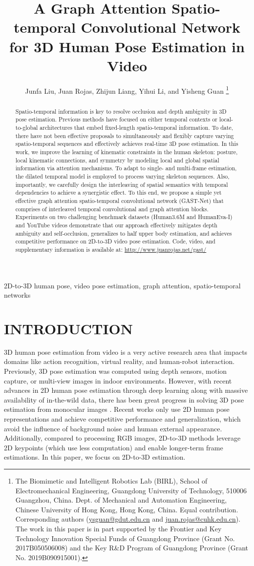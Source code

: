 \documentclass[letterpaper, 10 pt, conference, twoside]{ieeeconf}
\title{\LARGE \bf
	A Graph Attention Spatio-temporal Convolutional Network for 3D Human Pose Estimation in Video}
\author{Junfa Liu, Juan Rojas, Zhijun Liang, Yihui Li, and Yisheng Guan \thanks{The Biomimetic and Intelligent Robotics Lab (BIRL), School of Electromechanical Engineering, Guangdong University of Technology, 510006 Guangzhou, China. Dept. of Mechanical and Automation Engineering,  Chinese University of Hong Kong, Hong Kong, China.  Equal contribution.  Corresponding authors (\url{ysguan@gdut.edu.cn} and \url{juan.rojas@cuhk.edu.cn}). The work in this paper is in part supported by the  Frontier and Key Technology Innovation Special Funds of Guangdong Province (Grant No. 2017B050506008) and the Key R\&D Program of Guangdong Province (Grant No. 2019B090915001).}
	}
\begin{document}
\maketitle
\thispagestyle{empty}
\pagestyle{empty}
\begin{abstract}
Spatio-temporal information is key to resolve occlusion and depth ambiguity in 3D pose estimation. Previous methods have focused on either temporal contexts or local-to-global architectures that embed fixed-length spatio-temporal information. To date, there have not been effective proposals to simultaneously and flexibly capture varying spatio-temporal sequences and effectively achieves real-time 3D pose estimation.
In this work, we improve the learning of kinematic constraints in the human skeleton: posture, local kinematic connections, and symmetry by modeling local and global spatial information via attention mechanisms. To adapt to single- and multi-frame estimation, the dilated temporal model is employed to process varying skeleton sequences. Also, importantly, we carefully design the interleaving of spatial semantics with temporal dependencies to achieve a synergistic effect. 
To this end, we propose a simple yet effective graph attention spatio-temporal convolutional network (GAST-Net) that comprises of interleaved temporal convolutional and graph attention blocks.
Experiments on two challenging benchmark datasets (Human3.6M and HumanEva-I) and YouTube videos demonstrate that our approach effectively mitigates depth ambiguity and self-occlusion, generalizes to half upper body estimation, and achieves competitive performance on 2D-to-3D video pose estimation. Code, video, and supplementary information is available at: \href{http://www.juanrojas.net/gast/}{http://www.juanrojas.net/gast/}
\end{abstract}

\begin{keywords}
2D-to-3D human pose, video pose estimation, graph attention, spatio-temporal networks
\end{keywords}

\section{INTRODUCTION}
3D human pose estimation from video is a very active research area that impacts domains like action recognition, virtual reality, and human-robot interaction. Previously, 3D pose estimation was computed using depth sensors, motion capture, or multi-view images in indoor environments. However, with recent advances in 2D human pose estimation through deep learning along with massive availability of in-the-wild data, there has been great progress in solving 3D pose estimation from monocular images \cite{zhao2019semantic}. Recent works \cite{martinez2017simple,dabral2018learning,wandt2019repnet} only use 2D human pose representations and achieve competitive performance and generalization, which avoid the influence of background noise and human external appearance. Additionally, compared to processing RGB images, 2D-to-3D methods leverage 2D keypoints (which use less computation) and enable longer-term frame estimations. In this paper, we focus on 2D-to-3D estimation. 
\end{document}

